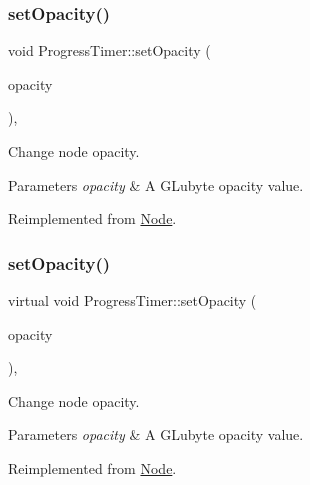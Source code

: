\subsubsection{\texorpdfstring{set\+Opacity()}{setOpacity()}\hspace{0.1cm}{\footnotesize\ttfamily [1/2]}}
{\footnotesize\ttfamily void Progress\+Timer\+::set\+Opacity (\begin{DoxyParamCaption}\item[{G\+Lubyte}]{opacity }\end{DoxyParamCaption})\hspace{0.3cm}{\ttfamily [override]}, {\ttfamily [virtual]}}

Change node opacity. 
\begin{DoxyParams}{Parameters}
{\em opacity} & A G\+Lubyte opacity value. \\
\hline
\end{DoxyParams}


Reimplemented from \hyperlink{classNode_ae41a9db63bfa3d466ee7c9d79c35352d}{Node}.

\mbox{\label{classProgressTimer_a757eb314cc8f4633c6e5e240b2e6a4e8}} 
\subsubsection{\texorpdfstring{set\+Opacity()}{setOpacity()}\hspace{0.1cm}{\footnotesize\ttfamily [2/2]}}
{\footnotesize\ttfamily virtual void Progress\+Timer\+::set\+Opacity (\begin{DoxyParamCaption}\item[{G\+Lubyte}]{opacity }\end{DoxyParamCaption})\hspace{0.3cm}{\ttfamily [override]}, {\ttfamily [virtual]}}

Change node opacity. 
\begin{DoxyParams}{Parameters}
{\em opacity} & A G\+Lubyte opacity value. \\
\hline
\end{DoxyParams}


Reimplemented from \hyperlink{classNode_ae41a9db63bfa3d466ee7c9d79c35352d}{Node}.

\mbox{\label{classProgressTimer_a13901defa20b543b0d92bbf043215945}} 
